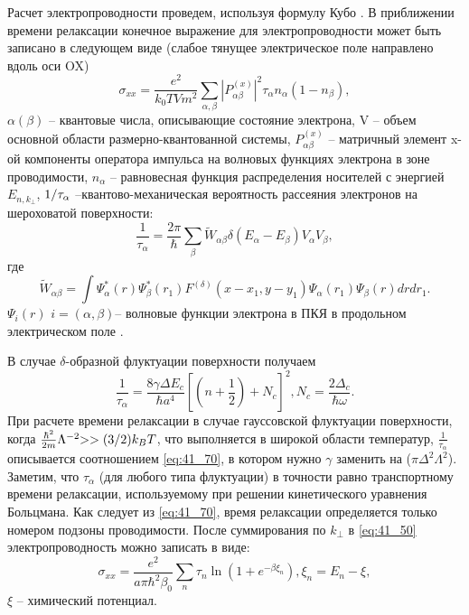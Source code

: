 Расчет электропроводности проведем, используя формулу Кубо \cite{Kubo1957a}. В приближении времени релаксации \cite{Khamidullin2002} конечное выражение для электропроводности может быть записано в следующем виде (слабое тянущее электрическое поле направлено вдоль оси OX)
\begin{equation} \label{eq:41_50}
\sigma _{xx} =\frac{e^{2} }{k_{0} TVm^{2} } \sum _{\alpha ,\beta }\left|P_{\alpha \beta }^{\left(x\right)} \right|^{2} \tau _{\alpha } n_{\alpha } \left(1-n_{\beta } \right) ,
\end{equation} 
$\alpha (\beta )$ -- квантовые числа, описывающие состояние электрона, V -- объем основной области размерно-квантованной системы, $P_{\alpha \beta }^{\left(x\right)} $ -- матричный элемент x-ой компоненты оператора импульса на волновых функциях электрона в зоне проводимости, $n_{\alpha } $ -- равновесная функция распределения носителей с энергией $E_{n,k_{\bot } } $, ${1 \mathord{\left/{\vphantom{1 \tau _{\alpha } }}\right.\kern-\nulldelimiterspace} \tau _{\alpha } } $ --квантово-механическая вероятность рассеяния электронов на шероховатой поверхности:
\begin{equation} \label{eq:41_60}
\frac{1}{\tau _{\alpha } } =\frac{2\pi }{\hbar } \sum _{\beta }\tilde{W}_{\alpha \beta } \delta \left(E_{\alpha } -E_{\beta } \right) V_{\alpha } V_{\beta } ,
\end{equation}
где  
\[
\tilde{W}_{\alpha \beta } =\int \Psi _{\alpha }^{*} \left(r\right)\Psi _{\beta }^{*} \left(r_{1} \right)F^{(\delta )} \left(x-x_{1} ,y-y_{1} \right)\Psi _{\alpha } \left(r_{1} \right)\Psi _{\beta } \left(r\right)drdr_{1}  .
\] 
$\Psi _{i} \left(r\right)$ $i=(\alpha ,\beta )$-- волновые функции электрона в ПКЯ в продольном электрическом поле \cite{Sinyavskii1998}.

В случае $\delta $-образной флуктуации поверхности получаем
\begin{equation} \label{eq:41_70}
\frac{1}{\tau _{\alpha } } =\frac{8\gamma \Delta E_{c} }{\hbar a^{4} } \left[\left(n+\frac{1}{2} \right)+N_{c} \right]^{2} , N_{c} =\frac{2\Delta _{c} }{\hbar \omega } .
\end{equation}  
При расчете времени релаксации в случае гауссовской флуктуации поверхности, когда $\frac{\hbar ^{2} }{2m} \Lambda ^{-2} {>>(3 \mathord{\left/{\vphantom{>>(3 2}}\right.\kern-\nulldelimiterspace} 2} )k_{B} T$, что выполняется в широкой области температур, $\frac{1}{\tau _{\alpha } } $ описывается соотношением \eqref{eq:41_70}, в котором нужно $\gamma $ заменить на ($\pi \Delta ^{2} \Lambda ^{2} $). Заметим, что $\tau _{\alpha } $ (для любого типа флуктуации) в точности равно транспортному времени релаксации, используемому при решении кинетического уравнения Больцмана. Как следует из \eqref{eq:41_70}, время релаксации определяется только номером подзоны проводимости. После суммирования по $k_{\bot } $ в \eqref{eq:41_50} электропроводность можно записать в виде:
\begin{equation} \label{eq:41_80}
\sigma _{xx} =\frac{e^{2} }{a\pi \hbar ^{2} \beta _{0} } \sum _{n}\tau _{n} \ln \left(1+e^{-\beta \xi _{n} } \right) , \xi _{n} =E_{n} -\xi ,
\end{equation}
$\xi $ -- химический потенциал.

